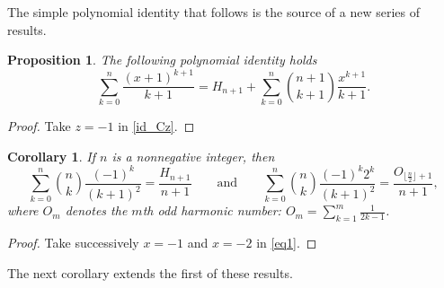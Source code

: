 \documentclass[11pt,reqno]{amsart}
\theoremstyle{plain}
\numberwithin{equation}{section}
\newtheorem{proposition}[thm]{Proposition}
\newtheorem{corollary}[thm]{Corollary}
\begin{document}
The simple polynomial identity that follows is the source of a new series of results.

\begin{proposition}
The following polynomial identity holds
\begin{equation}\label{eq1}
\sum_{k=0}^n \frac{(x+1)^{k+1}}{k+1} = H_{n+1} + \sum_{k=0}^n \binom{n+1}{k+1} \frac{x^{k+1}}{k+1}.
\end{equation}
\end{proposition}
\begin{proof}
Take $z=-1$ in \eqref{id_Cz}.
\end{proof}

\begin{corollary}
If $n$ is a nonnegative integer, then
\begin{equation}\label{eq 5}
\sum_{k=0}^n \binom{n}{k} \frac{(-1)^k}{(k+1)^2} = \frac{H_{n+1}}{n+1} \qquad\mbox{and}\qquad 
\sum_{k=0}^n \binom{n}{k} \frac{(-1)^k 2^k}{(k+1)^2} = \frac{O_{\lfloor{\frac{n}{2}}\rfloor+1}}{n+1},
\end{equation}
where $O_m$ denotes the $m$th odd harmonic number: $O_m=\sum_{k=1}^m\frac{1}{2k-1}$.
\end{corollary}
\begin{proof}
Take successively $x=-1$ and $x=-2$ in \eqref{eq1}.
\end{proof}

The next corollary extends the first of these results.
\end{document}
